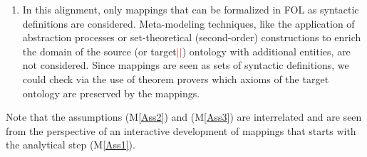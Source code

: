 \documentclass[ao]{iosart2x}
\newcommand{\nb}[1]{\textcolor{red}{$|$}\marginpar{\hspace*{-0cm}\parbox{20mm}{\scriptsize\raggedright\textcolor{red}{#1}}}}
\begin{document}
\begin{enumerate}[({\bf M}1)]
\item \label{Ass3} In this alignment, only mappings that can be formalized in FOL as syntactic definitions are considered. %
Meta-modeling techniques, like the application of abstraction processes or set-theoretical (second-order) constructions to enrich the domain of the source (or target\nb{SB: ho aggiunto, ci sta?}\nb{CM: non lo so, se ci sono entità in meno nella target, semplicemente non mappo alcune della source, poi è nel link inverso che le introduco, ma non ci ho pensato; inoltre, non sono sicuro che le second-orders definitions estendano sempre il dominio}) ontology with additional entities, are not considered. %
Since mappings are seen as sets of syntactic definitions, we could check via the use of theorem provers which axioms of the target ontology are preserved by the mappings.%
\end{enumerate}

Note that the assumptions (M\ref{Ass2}) and (M\ref{Ass3}) are interrelated and are seen from the perspective of an interactive development of mappings that starts with the analytical step (M\ref{Ass1}). 
\end{document}
